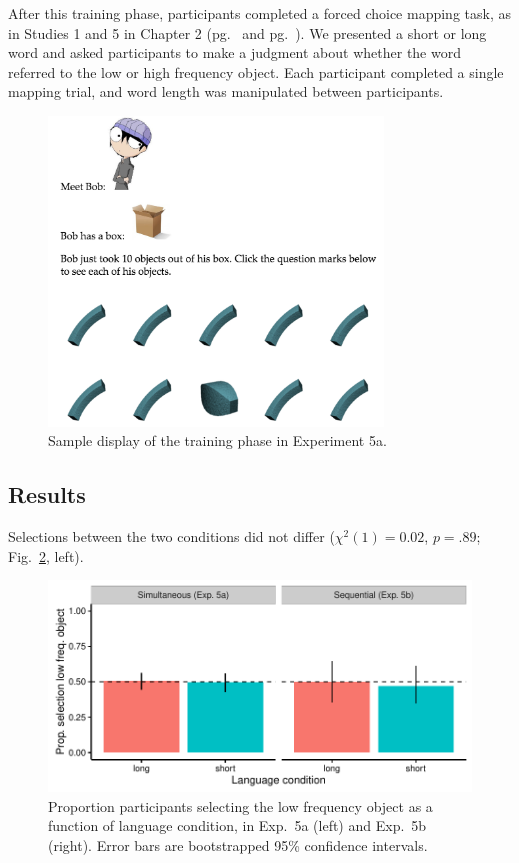 After this training phase, participants completed a forced choice mapping task, as in Studies 1 and 5 in Chapter 2 (pg.\ \pageref{ch2-1} and pg.\ \pageref{ch2-5}). We presented a short or long word and asked participants to make a judgment about whether the word referred to the low or high frequency object. Each participant completed a single mapping trial, and word length was manipulated between participants.

 \begin{figure}[t!]
 \begin{center}
  \includegraphics[width=3.5in]{figs/seqfreq_display.png}
  \caption{\label{fig:seqfreq_display} Sample display of the training phase in Experiment 5a.}
 \end{center}
\end{figure}


 \subsection{Results}
 Selections between the two conditions did not differ (${\chi}^2$$(1) = 0.02$, $p = .89$; Fig.\ \ref{fig:freq_plots}, left).
 
  \begin{figure}[t!]
 \begin{center}
  \includegraphics[width=6in]{figs/freq_plots.pdf}
  \caption{\label{fig:freq_plots} Proportion participants selecting the low frequency object as a function of language condition, in Exp.\ 5a (left) and Exp.\ 5b (right). Error bars are bootstrapped 95\% confidence intervals.}
 \end{center}
\end{figure}

